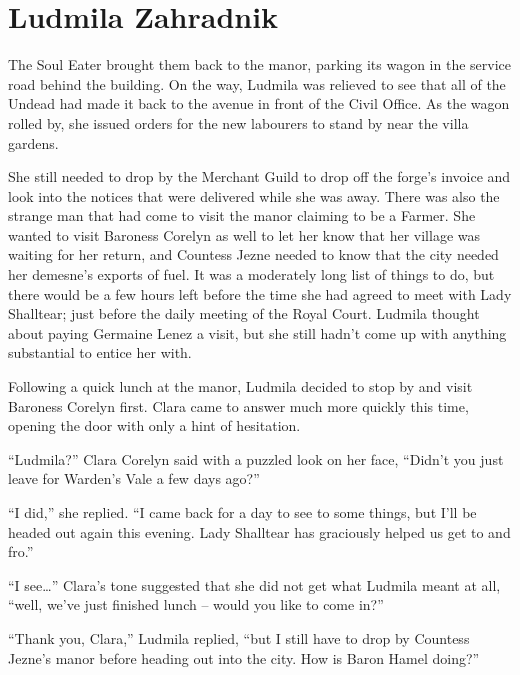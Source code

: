 \chapter{Ludmila Zahradnik}

The Soul Eater brought them back to the manor, parking its wagon in the service road behind the building. On the way, Ludmila was relieved to see that all of the Undead had made it back to the avenue in front of the Civil Office. As the wagon rolled by, she issued orders for the new labourers to stand by near the villa gardens.

 

She still needed to drop by the Merchant Guild to drop off the forge’s invoice and look into the notices that were delivered while she was away. There was also the strange man that had come to visit the manor claiming to be a Farmer. She wanted to visit Baroness Corelyn as well to let her know that her village was waiting for her return, and Countess Jezne needed to know that the city needed her demesne’s exports of fuel. It was a moderately long list of things to do, but there would be a few hours left before the time she had agreed to meet with Lady Shalltear; just before the daily meeting of the Royal Court. Ludmila thought about paying Germaine Lenez a visit, but she still hadn’t come up with anything substantial to entice her with.

 

Following a quick lunch at the manor, Ludmila decided to stop by and visit Baroness Corelyn first. Clara came to answer much more quickly this time, opening the door with only a hint of hesitation.

 

“Ludmila?” Clara Corelyn said with a puzzled look on her face, “Didn’t you just leave for Warden’s Vale a few days ago?”

 

“I did,” she replied. “I came back for a day to see to some things, but I’ll be headed out again this evening. Lady Shalltear has graciously helped us get to and fro.”

 

“I see…” Clara’s tone suggested that she did not get what Ludmila meant at all, “well, we’ve just finished lunch – would you like to come in?”

 

“Thank you, Clara,” Ludmila replied, “but I still have to drop by Countess Jezne’s manor before heading out into the city. How is Baron Hamel doing?”

